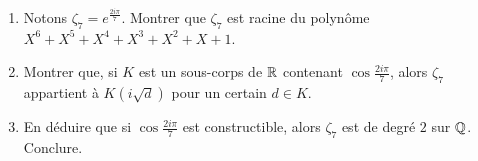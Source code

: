 \documentclass[a4paper,11pt,reqno]{amsart}
\begin{document}
\begin{exo}
\begin{enumerate}
\begin{enumerate}
      \item Notons $\zeta_7=e^{\frac{2i\pi}{7}}$. Montrer que $\zeta_7$ est racine du polynôme $X^6+X^5+X^4+X^3+X^2+X+1$.
      \item Montrer que, si $K$ est un sous-corps de $\mathbb{R}$ contenant $\cos\frac{2i\pi}{7}$, alors $\zeta_7$ appartient à $K(i\sqrt{d})$ pour un certain $d \in K$.
      \item En déduire que si $\cos\frac{2i\pi}{7}$ est constructible, alors $\zeta_7$ est de degré $2$ sur $\mathbb{Q}$. Conclure.
    \end{enumerate}
  \end{enumerate}
\end{exo}
\end{document}
